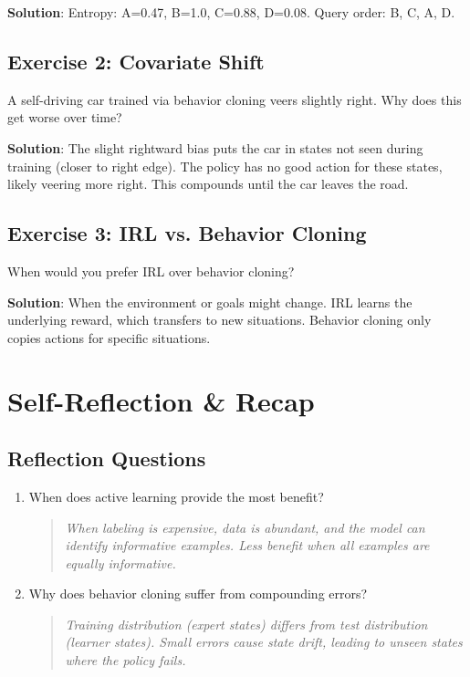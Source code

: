 \textbf{Solution}: Entropy: A=0.47, B=1.0, C=0.88, D=0.08. Query order: B, C, A, D.

\subsection{Exercise 2: Covariate Shift}

A self-driving car trained via behavior cloning veers slightly right. Why does this get worse over time?

\textbf{Solution}: The slight rightward bias puts the car in states not seen during training (closer to right edge). The policy has no good action for these states, likely veering more right. This compounds until the car leaves the road.

\subsection{Exercise 3: IRL vs. Behavior Cloning}

When would you prefer IRL over behavior cloning?

\textbf{Solution}: When the environment or goals might change. IRL learns the underlying reward, which transfers to new situations. Behavior cloning only copies actions for specific situations.


\section{Self-Reflection \& Recap}

\subsection{Reflection Questions}
\begin{enumerate}
    \item When does active learning provide the most benefit?
    \begin{quote}
        \textit{When labeling is expensive, data is abundant, and the model can identify informative examples. Less benefit when all examples are equally informative.}
    \end{quote}

    \item Why does behavior cloning suffer from compounding errors?
    \begin{quote}
        \textit{Training distribution (expert states) differs from test distribution (learner states). Small errors cause state drift, leading to unseen states where the policy fails.}
    \end{quote}
\end{enumerate}


